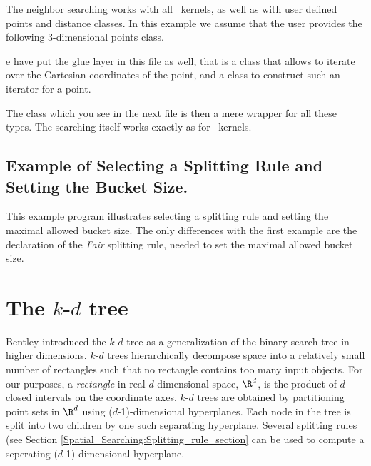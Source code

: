 The neighbor searching works with all \cgal\ kernels, as well as with
user defined points and distance classes.
In this example we assume that the user provides the following 3-dimensional 
points class.


e have put the glue layer in this file as well, that is a class that allows to 
iterate over the Cartesian coordinates of the point, and a class to construct
such an iterator for a point. 

The class  which you see in the next file is then a mere 
wrapper for all these types.  The searching itself works exactly as for \Cgal\ kernels.


\newpage
\subsection{Example of Selecting a Splitting Rule and Setting the Bucket Size.}

This example program illustrates selecting a splitting rule and
setting the maximal allowed bucket size.  The only differences with
the first example are the declaration of the {\em Fair} 
splitting rule, needed to set the maximal allowed bucket size.


\newpage

\section{The $k$-$d$ tree}
\label{Kd_tree_section}

Bentley \cite{b-mbstu-75} introduced the $k$-$d$ tree as a
generalization of the binary search tree in higher dimensions. $k$-$d$
trees hierarchically decompose space into a relatively small number of
rectangles such that no rectangle contains too many input objects.
For our purposes, a {\it rectangle} in real $d$ dimensional space,
$\R^d$, is the product of $d$ closed intervals on the coordinate axes.
$k$-$d$ trees are obtained by partitioning point sets in $\R^d$ using
($d$-1)-dimensional hyperplanes.  Each node in the tree is split into
two children by one such separating hyperplane.  Several splitting
rules (see Section \ref{Spatial_Searching:Splitting_rule_section} can
be used to compute a seperating ($d$-1)-dimensional hyperplane.

